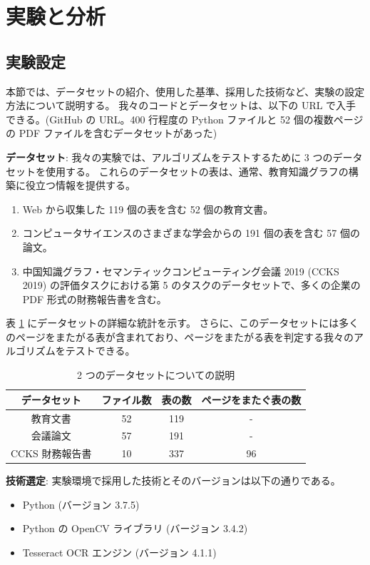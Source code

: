 \documentclass[uplatex, twocolumn,10pt]{jsarticle}
\begin{document}


\section{実験と分析}

\subsection{実験設定}
本節では、データセットの紹介、使用した基準、採用した技術など、実験の設定方法について説明する。
我々のコードとデータセットは、以下の URL で入手できる。(GitHub の URL。400 行程度の Python ファイルと 52 個の複数ページの PDF ファイルを含むデータセットがあった)

\textbf{データセット}:
我々の実験では、アルゴリズムをテストするために 3 つのデータセットを使用する。
これらのデータセットの表は、通常、教育知識グラフの構築に役立つ情報を提供する。

\begin{enumerate}
    \item Web から収集した 119 個の表を含む 52 個の教育文書。
    \item コンピュータサイエンスのさまざまな学会からの 191 個の表を含む 57 個の論文。
    \item 中国知識グラフ・セマンティックコンピューティング会議 2019 (CCKS 2019) の評価タスクにおける第 5 のタスクのデータセットで、多くの企業の PDF 形式の財務報告書を含む。
\end{enumerate}

表 \ref{table1} にデータセットの詳細な統計を示す。
さらに、このデータセットには多くのページをまたがる表が含まれており、ページをまたがる表を判定する我々のアルゴリズムをテストできる。

\begin{table}[tp]
    \centering
    \caption{2 つのデータセットについての説明}
    \label{table1}
    \begin{tabular}{cccc}
        データセット & ファイル数 & 表の数 & ページをまたぐ表の数 \\
        \toprule
        教育文書 & 52 & 119 & - \\
        会議論文 & 57 & 191 & - \\
        CCKS 財務報告書 & 10 & 337 & 96 \\
    \end{tabular}
\end{table}

\textbf{技術選定}:
実験環境で採用した技術とそのバージョンは以下の通りである。
\begin{itemize}
    \item Python (バージョン 3.7.5)
    \item Python の OpenCV ライブラリ (バージョン 3.4.2)
    \item Tesseract OCR エンジン (バージョン 4.1.1)
\end{itemize}
\end{document}
